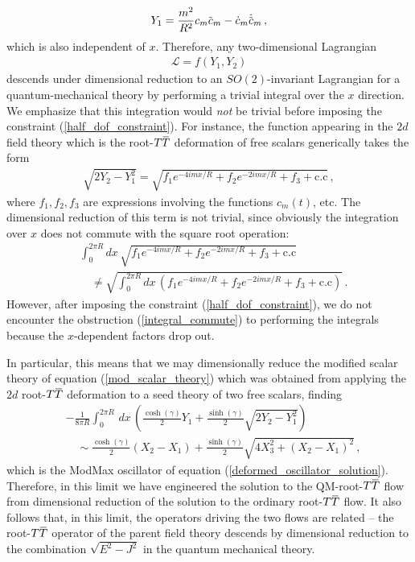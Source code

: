 \documentclass[12pt]{article}
\numberwithin{equation}{section}
\newcommand{\overbar}[1]{\mkern 1.5mu\overline{\mkern-1.5mu#1\mkern-1.5mu}\mkern 1.5mu}
\def\TT{{T\overbar{T}}}
\def\cbar{{\overbar{c}}}
\begin{document}
%
\begin{align}
    Y_1 = \frac{m^2}{R^2} c_m \cbar_{m} - \dot{c}_m \dot{\cbar}_{m} \, , 
\end{align}
%
which is also independent of $x$. Therefore, any two-dimensional Lagrangian
%
\begin{align}
    \mathcal{L} = f ( Y_1, Y_2 )
\end{align}
%
descends under dimensional reduction to an $SO(2)$-invariant Lagrangian for a quantum-mechanical theory by performing a trivial integral over the $x$ direction. We emphasize that this integration would \emph{not} be trivial before imposing the constraint (\ref{half_dof_constraint}). For instance, the function appearing in the $2d$ field theory which is the root-$\TT$ deformation of free scalars generically takes the form
%
\begin{align}
    \sqrt{ 2 Y_2 - Y_1^2 } = \sqrt{ f_1 e^{- 4 i m x / R} + f_2 e^{- 2 i m x / R} + f_3 + \text{c.c} } \, , 
\end{align}
%
where $f_1, f_2, f_3$ are expressions involving the functions $c_m ( t )$, etc. The dimensional reduction of this term is not trivial, since obviously the integration over $x$ does not commute with the square root operation:
%
\begin{align}\label{integral_commute}
    &\int_{0}^{2 \pi R} dx \, \sqrt{ f_1 e^{- 4 i m x / R} + f_2 e^{- 2 i m x / R} + f_3 + \text{c.c} } \nonumber \\
    &\quad \neq \sqrt{ \int_{0}^{2 \pi R} dx \, \left( f_1 e^{- 4 i m x / R} + f_2 e^{- 2 i m x / R} + f_3 + \text{c.c} \right) } \, .
\end{align}
%
However, after imposing the constraint (\ref{half_dof_constraint}), we do not encounter the obstruction (\ref{integral_commute}) to performing the integrals because the $x$-dependent factors drop out.

In particular, this means that we may dimensionally reduce the modified scalar theory of equation (\ref{mod_scalar_theory}) which was obtained from applying the $2d$ root-$\TT$ deformation to a seed theory of two free scalars, finding
%
\begin{align}
    &- \frac{1}{8 \pi R} \int_0^{2 \pi R} \, dx \, \left( \frac{\cosh ( \gamma )}{2} Y_1 + \frac{\sinh ( \gamma )}{2} \sqrt{ 2 Y_2 - Y_1^2 } \right) \, \nonumber \\
    &\quad \sim \frac{\cosh ( \gamma )}{2} ( X_2 - X_1 ) + \frac{\sinh ( \gamma )}{2} \sqrt{ 4 X_3^2 + \left( X_2 - X_1 \right)^2 } \, ,
\end{align}
%
which is the ModMax oscillator of equation (\ref{deformed_oscillator_solution}). Therefore, in this limit we have engineered the solution to the QM-root-$\TT$ flow from dimensional reduction of the solution to the ordinary root-$\TT$ flow. It also follows that, in this limit, the operators driving the two flows are related -- the root-$\TT$ operator of the parent field theory descends by dimensional reduction to the combination $\sqrt{ E^2 - J^2 }$ in the quantum mechanical theory.
\end{document}
